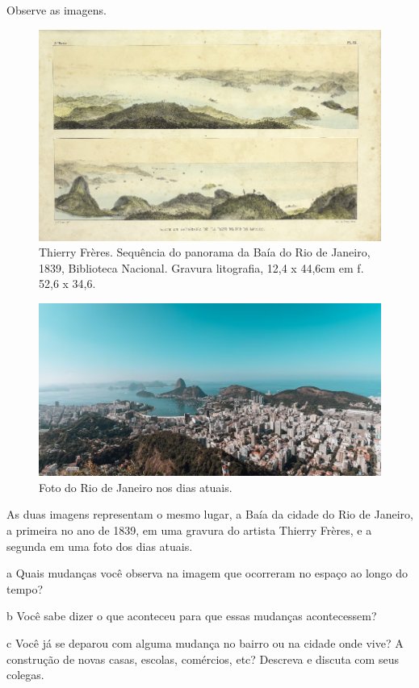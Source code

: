 Observe as imagens.

\begin{figure}[htpb!]
\includegraphics[width=.5\textwidth]{./imgs/img29.jpg}
\caption{Thierry Frères. Sequência do panorama da Baía do Rio de Janeiro, 1839, Biblioteca Nacional. Gravura litografia, 12,4 x 44,6cm em f. 52,6 x 34,6.}
\end{figure}

\begin{figure}[htpb!]
\includegraphics[width=.5\textwidth]{./imgs/img30.png}
\caption{Foto do Rio de Janeiro nos dias atuais.}
\end{figure}


As duas imagens representam o mesmo lugar, a Baía da cidade do Rio de
Janeiro, a primeira no ano de 1839, em uma gravura do artista Thierry
Frères, e a segunda em uma foto dos dias atuais.

\num{a} Quais mudanças você observa na imagem que ocorreram no espaço ao longo
do tempo? 


\num{b} Você sabe dizer o que aconteceu para que essas mudanças acontecessem?


\num{c} Você já se deparou com alguma mudança no bairro ou na cidade onde vive?
A construção de novas casas, escolas, comércios, etc? Descreva e discuta
com seus colegas.

